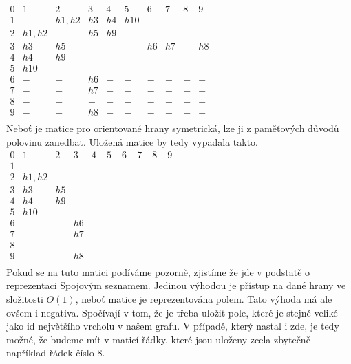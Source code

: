 $\begin{matrix}
 0 & 1 & 2 & 3 & 4 & 5 & 6 & 7 & 8 & 9 \\
 1 & - & h1,h2 & h3 & h4 & h10 & - & - & - & - \\
 2 & h1,h2 & - & h5 & h9 & - & - & - & - & - \\
 3 & h3 & h5  & - & - & - & h6 & h7 & - & h8 \\
 4 & h4 & h9 & - & - & - & - & - & - & - \\
 5 & h10 & - & - & - & - & - & - & - & - \\
 6 & - & - & h6 & - & - & - & - & - & - \\
 7 & - & - & h7 & - & - & - & - & - & - \\
 8 & - & - & - & - & - & - & - & - & - \\
 9 & - & - & h8 & - & - & - & - & - & - \\
\end{matrix}$\\

Neboť je matice pro orientované hrany symetrická, lze ji z paměťových důvodů polovinu zanedbat.
Uložená matice by tedy vypadala takto.\\

$\begin{matrix}
0 & 1 & 2 & 3 & 4 & 5 & 6 & 7 & 8 & 9 \\
1 & -  \\
2 & h1,h2 & -  \\
3 & h3 & h5  & -  \\
4 & h4 & h9 & - & -  \\
5 & h10 & - & - & - & -  \\
6 & - & - & h6 & - & - & - \\
7 & - & - & h7 & - & - & - & - \\
8 & - & - & - & - & - & - & - & -  \\
9 & - & - & h8 & - & - & - & - & - & - \\
\end{matrix}$\\

Pokud se na tuto matici podíváme pozorně, zjistíme že jde v podstatě o reprezentaci Spojovým seznamem. Jedinou výhodou je přístup na dané hrany ve složitosti $O(1)$, neboť matice je reprezentována polem. Tato výhoda má ale ovšem i negativa. Spočívají v tom, že je třeba uložit pole, které je stejně veliké jako id největšího vrcholu v našem grafu. V případě, který nastal i zde, je tedy možné, že budeme mít v maticí řádky, které jsou uloženy zcela zbytečně například řádek číslo 8.\\

